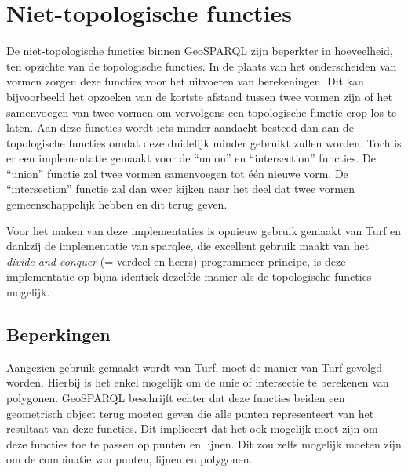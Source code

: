 \section{Niet-topologische functies}
\label{sec:niet_topologische_functies}
De niet-topologische functies binnen GeoSPARQL zijn beperkter in hoeveelheid, ten opzichte van de topologische functies. In de plaats van het onderscheiden van vormen zorgen deze functies voor het uitvoeren van berekeningen. Dit kan bijvoorbeeld het opzoeken van de kortste afstand tussen twee vormen zijn of het samenvoegen van twee vormen om vervolgens een topologische functie erop los te laten. Aan deze functies wordt iets minder aandacht besteed dan aan de topologische functies omdat deze duidelijk minder gebruikt zullen worden. Toch is er een implementatie gemaakt voor de ``union'' en ``intersection'' functies. De ``union'' functie zal twee vormen samenvoegen tot één nieuwe vorm. De ``intersection'' functie zal dan weer kijken naar het deel dat twee vormen gemeenschappelijk hebben en dit terug geven. 

Voor het maken van deze implementaties is opnieuw gebruik gemaakt van Turf en dankzij de implementatie van sparqlee, die excellent gebruik maakt van het \textit{divide-and-conquer} (= verdeel en heers) programmeer principe, is deze implementatie op bijna identiek dezelfde manier als de topologische functies mogelijk.

\subsection{Beperkingen}
Aangezien gebruik gemaakt wordt van Turf, moet de manier van Turf gevolgd worden. Hierbij is het enkel mogelijk om de unie of intersectie te berekenen van polygonen. GeoSPARQL beschrijft echter dat deze functies beiden een geometrisch object terug moeten geven die alle punten representeert van het resultaat van deze functies. Dit impliceert dat het ook mogelijk moet zijn om deze functies toe te passen op punten en lijnen. Dit zou zelfs mogelijk moeten zijn om de combinatie van punten, lijnen en polygonen.


